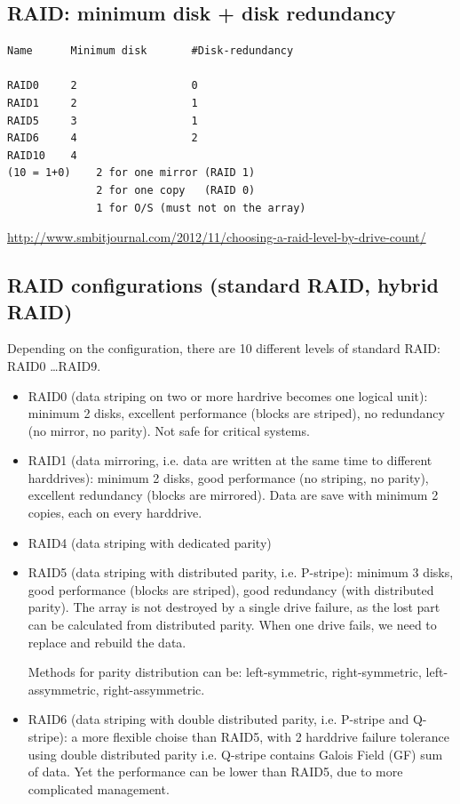 \subsection{RAID: minimum disk + disk redundancy}

\begin{verbatim}
Name      Minimum disk       #Disk-redundancy         

RAID0     2                  0
RAID1     2                  1
RAID5     3                  1
RAID6     4                  2
RAID10    4
(10 = 1+0)    2 for one mirror (RAID 1)
              2 for one copy   (RAID 0)
              1 for O/S (must not on the array)                  
\end{verbatim}
\url{http://www.smbitjournal.com/2012/11/choosing-a-raid-level-by-drive-count/}

\subsection{RAID configurations (standard RAID, hybrid RAID)}
\label{sec:RAID_configurations}

Depending on the configuration, there are 10 different levels of standard RAID:
RAID0 \ldots RAID9.
\begin{itemize}
  \item RAID0 (data striping on two or more hardrive becomes one logical
  unit):  minimum 2 disks, excellent performance (blocks are striped), no
  redundancy (no mirror, no parity). Not safe for critical systems. 
  \item RAID1 (data mirroring, i.e. data are written at the same time to
  different harddrives):
  minimum 2 disks, good performance (no striping, no parity), excellent
  redundancy (blocks are mirrored). Data are save with minimum 2 copies, each on every harddrive.
  
  \item RAID4 (data striping with dedicated parity) 
  
  \item RAID5 (data striping with distributed parity, i.e. P-stripe): minimum 3
  disks, good performance (blocks are striped), good redundancy (with distributed parity).
  The array is not destroyed by a single drive failure, as the lost part can be
  calculated from distributed parity.
  When one drive fails, we need to replace and rebuild the data.
  
  Methods for parity distribution can be: left-symmetric, right-symmetric,
  left-assymmetric, right-assymmetric. 
  
  \item RAID6 (data striping with double distributed parity, i.e. P-stripe and
  Q-stripe): a more flexible choise than RAID5, with 2 harddrive failure
  tolerance using double distributed parity i.e. Q-stripe contains Galois
  Field (GF) sum of data.
  Yet the performance can be lower than RAID5, due to more complicated management. 
  
\end{itemize}

